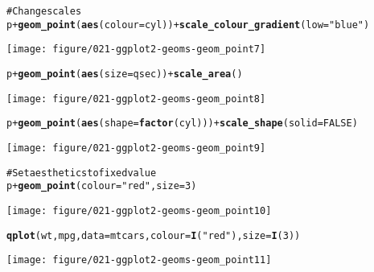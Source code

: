 \documentclass[a4paper,titlepage]{tufte-handout}\usepackage{graphicx, color}
\makeatletter
\def\maxwidth{ %
  \ifdim\Gin@nat@width>\linewidth
    \linewidth
  \else
    \Gin@nat@width
  \fi
}
\newcommand{\hlfunctioncall}[1]{\textcolor[rgb]{0.501960784313725,0,0.329411764705882}{\textbf{#1}}}%
\newcommand{\hlstring}[1]{\textcolor[rgb]{0.6,0.6,1}{#1}}%
\newcommand{\hlcomment}[1]{\textcolor[rgb]{0.180392156862745,0.6,0.341176470588235}{#1}}%
\newenvironment{kframe}{%
 \def\at@end@of@kframe{}%
 \ifinner\ifhmode%
  \def\at@end@of@kframe{\end{minipage}}%
  \begin{minipage}{\columnwidth}%
 \fi\fi%
 \def\FrameCommand##1{\hskip\@totalleftmargin \hskip-\fboxsep
 \colorbox{shadecolor}{##1}\hskip-\fboxsep
     \hskip-\linewidth \hskip-\@totalleftmargin \hskip\columnwidth}%
 \MakeFramed {\advance\hsize-\width
   \@totalleftmargin\z@ \linewidth\hsize
   \@setminipage}}%
 {\par\unskip\endMakeFramed%
 \at@end@of@kframe}
\newenvironment{knitrout}{}{} %
\makeatother
\begin{document}
\begin{knitrout}
\begin{kframe}
\begin{alltt}
\hlcomment{# Change scales}
p + \hlfunctioncall{geom_point}(\hlfunctioncall{aes}(colour = cyl)) + \hlfunctioncall{scale_colour_gradient}(low = \hlstring{"blue"})
\end{alltt}
\end{kframe}
\texttt{[image: figure/021-ggplot2-geoms-geom\_point7]} 
\begin{kframe}\begin{alltt}
p + \hlfunctioncall{geom_point}(\hlfunctioncall{aes}(size = qsec)) + \hlfunctioncall{scale_area}()
\end{alltt}
\end{kframe}
\texttt{[image: figure/021-ggplot2-geoms-geom\_point8]} 
\begin{kframe}\begin{alltt}
p + \hlfunctioncall{geom_point}(\hlfunctioncall{aes}(shape = \hlfunctioncall{factor}(cyl))) + \hlfunctioncall{scale_shape}(solid = FALSE)
\end{alltt}
\end{kframe}
\texttt{[image: figure/021-ggplot2-geoms-geom\_point9]} 
\begin{kframe}\begin{alltt}

\hlcomment{# Set aesthetics to fixed value}
p + \hlfunctioncall{geom_point}(colour = \hlstring{"red"}, size = 3)
\end{alltt}
\end{kframe}
\texttt{[image: figure/021-ggplot2-geoms-geom\_point10]} 
\begin{kframe}\begin{alltt}
\hlfunctioncall{qplot}(wt, mpg, data = mtcars, colour = \hlfunctioncall{I}(\hlstring{"red"}), size = \hlfunctioncall{I}(3))
\end{alltt}
\end{kframe}
\texttt{[image: figure/021-ggplot2-geoms-geom\_point11]} 
\begin{kframe}\begin{alltt}


\end{alltt}
\end{kframe}
\end{knitrout}
\end{document}

